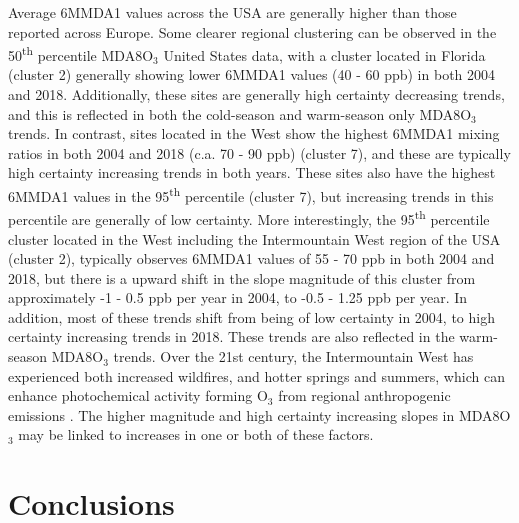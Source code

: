 \documentclass[journal abbreviation, manuscript]{copernicus}
\begin{document}
Average 6MMDA1 values across the USA are generally higher than those reported across Europe. Some clearer regional clustering can be observed in the 50\textsuperscript{th} percentile MDA8O$_3$ United States data, with a cluster located in Florida (cluster 2) generally showing lower 6MMDA1 values (40 - 60 ppb) in both 2004 and 2018. Additionally, these sites are generally high certainty decreasing trends, and this is reflected in both the cold-season and warm-season only MDA8O$_3$ trends. In contrast, sites located in the West show the highest 6MMDA1 mixing ratios in both 2004 and 2018 (c.a. 70 - 90 ppb) (cluster 7), and these are typically high certainty increasing trends in both years. These sites also have the highest 6MMDA1 values in the 95\textsuperscript{th} percentile (cluster 7), but increasing trends in this percentile are generally of low certainty. More interestingly, the 95\textsuperscript{th} percentile cluster located in the West including the Intermountain West region of the USA (cluster 2), typically observes 6MMDA1 values of 55 - 70 ppb in both 2004 and 2018, but there is a upward shift in the slope magnitude of this cluster from approximately -1 - 0.5 ppb per year in 2004, to -0.5 - 1.25 ppb per year. In addition, most of these trends shift from being of low certainty in 2004, to high certainty increasing trends in 2018. These trends are also reflected in the warm-season MDA8O$_3$ trends. Over the 21st century, the Intermountain West has experienced both increased wildfires, and hotter springs and summers, which can enhance photochemical activity forming O$_3$ from regional anthropogenic emissions \citep{Lin2017, Li2021, Peterson2021, Iglesias2022}. The higher magnitude and high certainty increasing slopes in MDA8O$_3$ may be linked to increases in one or both of these factors.


\section{Conclusions}  %
\end{document}
